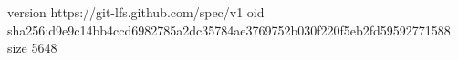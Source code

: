 version https://git-lfs.github.com/spec/v1
oid sha256:d9e9c14bb4ccd6982785a2dc35784ae3769752b030f220f5eb2fd59592771588
size 5648
